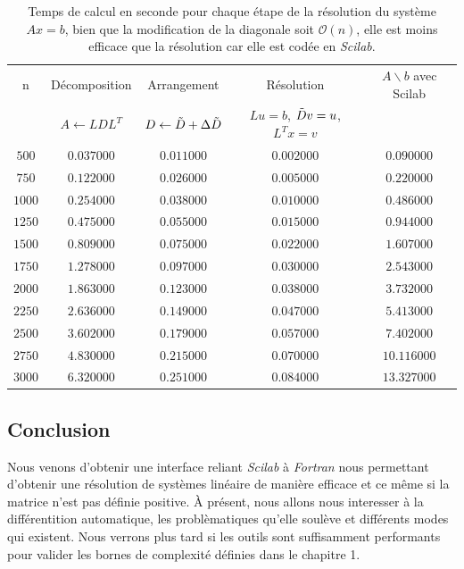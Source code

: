 \begin{table}[h]
	\begin{center}
\begin{tabular}{|c|c|c|c|c|}\hline
n & D\'ecomposition & Arrangement & R\'esolution & $A \backslash b$ avec Scilab\\
 & $A\leftarrow LDL^T$ & $D\leftarrow \Tilde{D}+\Delta \Tilde{D}$& $Lu=b$, $\Tilde{D}v=u$, $L^Tx=v$ & \\
\hline
$500 $&$  0.037000 $&$  0.011000 $&$ 0.002000 $&$ 0.090000$\\\hline
$750 $&$ 0.122000 $&$ 0.026000 $&$ 0.005000 $&$ 0.220000$\\\hline
$1000 $&$ 0.254000 $&$ 0.038000 $&$ 0.010000 $&$ 0.486000$\\\hline
$1250 $&$ 0.475000 $&$ 0.055000 $&$ 0.015000 $&$ 0.944000$\\\hline
$1500 $&$ 0.809000 $&$ 0.075000 $&$ 0.022000 $&$ 1.607000$\\\hline
$1750 $&$ 1.278000 $&$ 0.097000 $&$ 0.030000 $&$ 2.543000$\\\hline
$2000 $&$ 1.863000 $&$ 0.123000 $&$ 0.038000 $&$ 3.732000$\\\hline
$2250 $&$ 2.636000 $&$ 0.149000 $&$ 0.047000 $&$ 5.413000$\\\hline
$2500 $&$ 3.602000 $&$ 0.179000 $&$ 0.057000 $&$ 7.402000$\\\hline
$2750 $&$ 4.830000 $&$ 0.215000 $&$ 0.070000 $&$ 10.116000$\\\hline
$3000 $&$ 6.320000 $&$ 0.251000 $&$ 0.084000 $&$ 13.327000$\\\hline
\end{tabular}
	\end{center}
	\caption{Temps de calcul en seconde pour chaque \'etape de la r\'esolution du syst\`eme $Ax=b$, bien que la modification de la diagonale soit
$\mathcal{O}(n)$, elle est moins efficace que la r\'esolution car elle est cod\'ee en {\it Scilab}.}
	\label{tab:newton}
\end{table}



{\co 
\subsection{Conclusion}
Nous venons d'obtenir une interface reliant {\it Scilab} \`a {\it Fortran} nous permettant d'obtenir
une r\'esolution de syst\`emes lin\'eaire de mani\`ere efficace et ce même si la matrice n'est pas d\'efinie 
positive. 
\`A pr\'esent, nous allons nous interesser \`a la diff\'erentition automatique, les probl\`ematiques qu'elle
soul\`eve et diff\'erents modes qui existent. Nous verrons plus tard si les outils sont suffisamment performants
pour valider les bornes de complexit\'e d\'efinies dans le chapitre 1.
}




